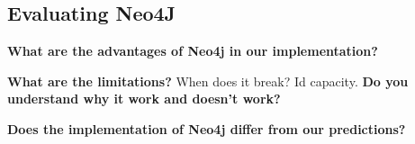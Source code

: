 \subsection{Evaluating Neo4J}


\textbf{What are the advantages of Neo4j in our implementation?}

\textbf{What are the limitations?}
When does it break?
Id capacity.
\textbf{Do you understand why it work and doesn't work?}

\textbf{Does the implementation of Neo4j differ from our predictions?}

